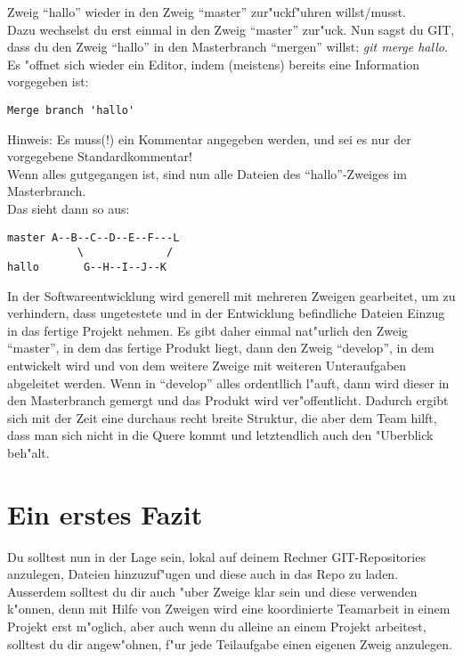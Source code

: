 \documentclass[german,a4paper]{report}
\begin{document}
Zweig ``hallo'' wieder in den Zweig ``master'' zur"uckf"uhren willst/musst.\\
Dazu wechselst du erst einmal in den Zweig ``master'' zur"uck. Nun sagst du GIT, dass du den
Zweig ``hallo'' in den Masterbranch ``mergen'' willst: \textit{git merge hallo}.
Es "offnet sich wieder ein Editor, indem (meistens) bereits eine Information vorgegeben ist:
\begin{verbatim}
Merge branch 'hallo'
\end{verbatim}
Hinweis: Es muss(!) ein Kommentar angegeben werden, und sei es nur der vorgegebene
Standardkommentar!\\
Wenn alles gutgegangen ist, sind nun alle Dateien des ``hallo''-Zweiges im Masterbranch.\\
Das sieht dann so aus:
\begin{verbatim}
master A--B--C--D--E--F---L
           \             /
hallo       G--H--I--J--K
\end{verbatim}
In der Softwareentwicklung wird generell mit mehreren Zweigen gearbeitet, um zu verhindern,
dass ungetestete und in der Entwicklung befindliche Dateien Einzug in das fertige Projekt
nehmen. Es gibt daher einmal nat"urlich den Zweig ``master'', in dem das fertige Produkt
liegt, dann den Zweig ``develop'', in dem entwickelt wird und von dem weitere Zweige mit
weiteren Unteraufgaben abgeleitet werden. Wenn in ``develop'' alles ordentllich l"auft, dann
wird dieser in den Masterbranch gemergt und das Produkt wird ver"offentlicht.
Dadurch ergibt sich mit der Zeit eine durchaus recht breite Struktur, die aber dem Team
hilft, dass man sich nicht in die Quere kommt und letztendlich auch den "Uberblick
beh"alt.

\chapter{Ein erstes Fazit}
Du solltest nun in der Lage sein, lokal auf deinem Rechner GIT-Repositories anzulegen,
Dateien hinzuzuf"ugen und diese auch in das Repo zu laden. Ausserdem solltest du dir
auch "uber Zweige klar sein und diese verwenden k"onnen, denn mit Hilfe von Zweigen wird
eine koordinierte Teamarbeit in einem Projekt erst m"oglich, aber auch wenn du alleine
an einem Projekt arbeitest, solltest du dir angew"ohnen, f"ur jede Teilaufgabe einen eigenen
Zweig anzulegen.
\end{document}

